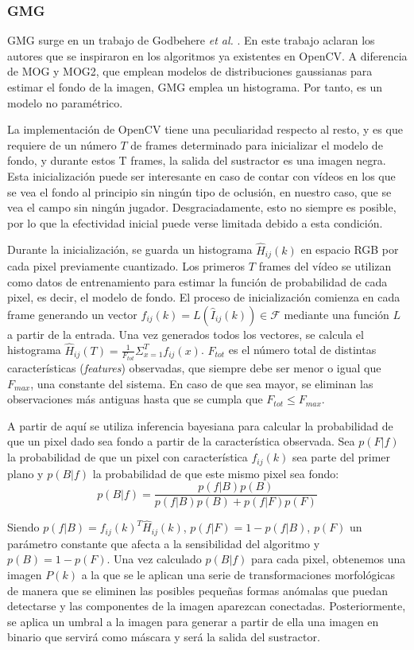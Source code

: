 \subsubsection*{GMG}
GMG surge en un trabajo de Godbehere \textit{et al.} \cite{art:Godbehere}. En este trabajo aclaran los autores que se inspiraron en los algoritmos ya existentes en OpenCV. A diferencia de MOG y MOG2, que emplean modelos de distribuciones gaussianas para estimar el fondo de la imagen, GMG emplea un histograma. Por tanto, es un modelo no paramétrico.

La implementación de OpenCV tiene una peculiaridad respecto al resto, y es que requiere de un número $T$ de frames determinado para inicializar el modelo de fondo, y durante estos T frames, la salida del sustractor es una imagen negra. Esta inicialización puede ser interesante en caso de contar con vídeos en los que se vea el fondo al principio sin ningún tipo de oclusión, en nuestro caso, que se vea el campo sin ningún jugador. Desgraciadamente, esto no siempre es posible, por lo que la efectividad inicial puede verse limitada debido a esta condición.

Durante la inicialización, se guarda un histograma $\hat{H}_{ij}(k)$ en espacio RGB por cada pixel previamente cuantizado. Los primeros $T$ frames del vídeo se utilizan como datos de entrenamiento para estimar la función de probabilidad de cada pixel, es decir, el modelo de fondo. El proceso de inicialización comienza en cada frame generando un vector $f_{ij}(k) = L(\hat{I}_{ij}(k)) \in \mathcal{F}$ mediante una función $L$ a partir de la entrada. Una vez generados todos los vectores, se calcula el histograma $\hat{H}_{ij}(T) = \frac{1}{F_{tot}}\Sigma_{x = 1}^T f_{ij}(x)$. $F_{tot}$ es el número total de distintas características (\textit{features}) observadas, que siempre debe ser menor o igual que $F_{max}$, una constante del sistema. En caso de que sea mayor, se eliminan las observaciones más antiguas hasta que se cumpla que $F_{tot} \leq F_{max}$.

A partir de aquí se utiliza inferencia bayesiana para calcular la probabilidad de que un pixel dado sea fondo a partir de la característica observada. Sea $p(F|f)$ la probabilidad de que un pixel con característica $f_{ij}(k)$ sea parte del primer plano y $p(B|f)$ la probabilidad de que este mismo pixel sea fondo:
\[
    p(B|f) = \frac{p(f|B)p(B)}{p(f|B)p(B)+p(f|F)p(F)}
\]

Siendo $p(f|B) = f_{ij}(k)^T\hat{H}_{ij}(k)$, $p(f|F) = 1 - p(f|B)$, $p(F)$ un parámetro constante que afecta a la sensibilidad del algoritmo y $p(B) = 1 - p(F)$. Una vez calculado $p(B|f)$ para cada pixel, obtenemos una imagen $P(k)$ a la que se le aplican una serie de transformaciones morfológicas de manera que se eliminen las posibles pequeñas formas anómalas que puedan detectarse y las componentes de la imagen aparezcan conectadas. Posteriormente, se aplica un umbral a la imagen para generar a partir de ella una imagen en binario que servirá como máscara y será la salida del sustractor.

